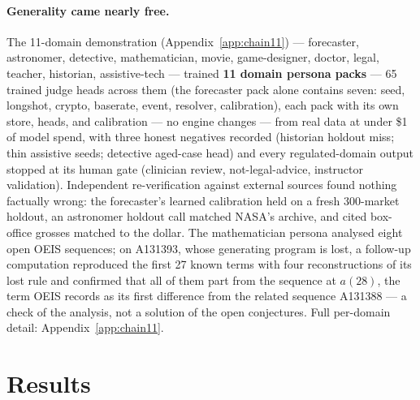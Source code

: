 \documentclass[11pt]{article}
\begin{document}
\paragraph{Generality came nearly free.} The 11-domain demonstration (Appendix~\ref{app:chain11}) --- forecaster, astronomer, detective, mathematician, movie, game-designer, doctor, legal, teacher, historian, assistive-tech --- trained \textbf{11 domain persona packs} --- 65 trained judge heads across them (the forecaster pack alone contains seven: seed, longshot, crypto, baserate, event, resolver, calibration), each pack with its own store, heads, and calibration --- no engine changes --- from real data at under \$1 of model spend, with three honest negatives recorded (historian holdout miss; thin assistive seeds; detective aged-case head) and every regulated-domain output stopped at its human gate (clinician review, not-legal-advice, instructor validation). Independent re-verification against external sources found nothing factually wrong: the forecaster's learned calibration held on a fresh 300-market holdout, an astronomer holdout call matched NASA's archive, and cited box-office grosses matched to the dollar. The mathematician persona analysed eight open OEIS sequences; on A131393, whose generating program is lost, a follow-up computation reproduced the first 27 known terms with four reconstructions of its lost rule and confirmed that all of them part from the sequence at $a(28)$, the term OEIS records as its first difference from the related sequence A131388 --- a check of the analysis, not a solution of the open conjectures. Full per-domain detail: Appendix~\ref{app:chain11}.

\section{Results}
\label{sec:results}
\end{document}
